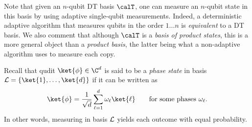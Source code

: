 \begin{remark}
    Note that given an $n$-qubit DT basis $\calT$, one can measure an $n$-qubit state in this basis by using adaptive single-qubit measurements.
    Indeed, a deterministic adaptive algorithm that measures qubits in the order $1 \dots n$ is \emph{equivalent} to a DT basis.
    We also comment that although $\calT$ is a \emph{basis of product states}, this is a more general object than a \emph{product basis}, the latter being what a non-adaptive algorithm uses to measure each copy.
\end{remark}

\begin{definition}
    Recall that qudit $\ket{\phi} \in \C^d$ is said to be a \emph{phase state} in basis $\mathcal{L} = \{ \ket{1}, \dots, \ket{d} \}$ if it can be written as
    \begin{equation*}
        \ket{\phi} = \frac{1}{\sqrt{d}} \sum_{\ell=1}^d \omega_\ell \ket{\ell} \qquad \text{for some phases $\omega_\ell$}.
    \end{equation*}
    In other words, measuring in basis $\cal{L}$ yields each outcome with equal probability.
\end{definition}

